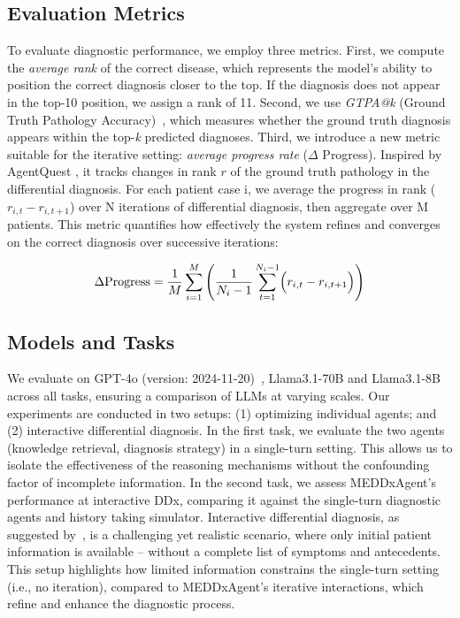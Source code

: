 \subsection{Evaluation Metrics}
To evaluate diagnostic performance, we employ three metrics. First, we compute the \textit{average rank} of the correct disease, which represents the model’s ability to position the correct diagnosis closer to the top. If the diagnosis does not appear in the top-10 position, we assign a rank of 11. Second, we use \textit{GTPA@k} (Ground Truth Pathology Accuracy)~\citep{fansi2022ddxplus}, which measures whether the ground truth diagnosis appears within the top-\textit{k} predicted diagnoses.
Third, we introduce a new metric suitable for the iterative setting: \textit{average progress rate} ($\Delta$ Progress). Inspired by AgentQuest \cite{gioacchini-etal-2024-agentquest}, it tracks changes in rank $r$ of the ground truth pathology in the differential diagnosis. For each patient case i, we average the progress in rank ($r_{i,t}-r_{i,t+1}$) over N iterations of differential diagnosis, then aggregate over M patients. This metric quantifies how effectively the system refines and converges on the correct diagnosis over successive iterations:

\small{
\begin{equation*}
\Delta \text{Progress} = \frac{1}{M} \sum_{i=1}^{M} \left( \frac{1}{N_i - 1} \sum_{t=1}^{N_i-1} \Bigl( r_{i,t} - r_{i,t+1} \Bigr) \right)
\end{equation*}}
\normalsize
\subsection{Models and Tasks}

We evaluate on GPT-4o (version: \textsc{2024-11-20})~\citep{hurst2024gpt}, Llama3.1-70B and Llama3.1-8B~\citep{dubey2024llama} across all tasks, ensuring a comparison of LLMs at varying scales.  Our experiments are conducted in two setups: (1) optimizing individual agents; and (2) interactive differential diagnosis. In the first task, we evaluate the two agents (knowledge retrieval, diagnosis strategy) in a single-turn setting. This allows us to isolate the effectiveness of the reasoning mechanisms without the confounding factor of incomplete information. In the second task, we assess MEDDxAgent's performance at interactive DDx, comparing it against the single-turn diagnostic agents and history taking simulator. Interactive differential diagnosis, as suggested by~\citet{li2024mediq}, is a challenging yet realistic scenario, where only initial patient information is available -- without a complete list of symptoms and antecedents. This setup highlights how limited information constrains the single-turn setting (i.e., no iteration), compared to MEDDxAgent's iterative interactions, which refine and enhance the diagnostic process.

